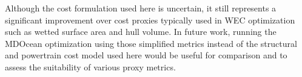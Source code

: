 Although the cost formulation used here is uncertain, it still represents a significant improvement over cost proxies typically used in WEC optimization such as wetted surface area and hull volume.
In future work, running the MDOcean optimization using those simplified metrics instead of the structural and powertrain cost model used here would be useful for comparison and to assess the suitability of various proxy metrics. 




